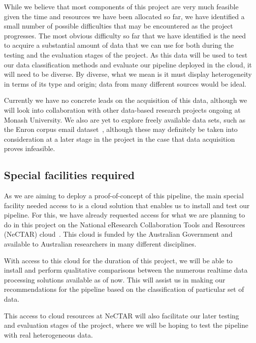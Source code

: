 \documentclass[a4paper,11pt]{article}
\begin{document}
While we believe that most components of this project are very much feasible given the time and resources we have been
allocated so far, we have identified a small number of possible difficulties that may be encountered as the project
progresses. The most obvious difficulty so far that we have identified is the need to acquire a substantial amount of
data that we can use for both during the testing and the evaluation stages of the project. As this data will be used to
test our data classification methods and evaluate our pipeline deployed in the cloud, it will need to be diverse. By
diverse, what we mean is it must display heterogeneity in terms of its type and origin; data from many different sources
would be ideal.

Currently we have no concrete leads on the acquisition of this data, although we will look into collaboration with other
data-based research projects ongoing at Monash University. We also are yet to explore freely available data sets, such
as the Enron corpus email dataset~\cite{klimt2004introducing}, although these may definitely be taken into consideration
at a later stage in the project in the case that data acquisition proves infeasible.


\subsection{Special facilities required} %
\label{sub:special_facilities_required}

As we are aiming to deploy a proof-of-concept of this pipeline, the main special facility needed access to is a cloud
solution that enables us to install and test our pipeline. For this, we have already requested access for what we are
planning to do in this project on the National eResearch Collaboration Tools and Resources (NeCTAR)
cloud~\cite{web:Nectar}. This cloud is funded by the Australian Government and available to Australian researchers in
many different disciplines.

With access to this cloud for the duration of this project, we will be able to install and perform qualitative
comparisons between the numerous realtime data processing solutions available as of now. This will assist us in making
our recommendations for the pipeline based on the classification of particular set of data.

This access to cloud resources at NeCTAR will also facilitate our later testing and evaluation stages of the project,
where we will be hoping to test the pipeline with real heterogeneous data.
\end{document}
